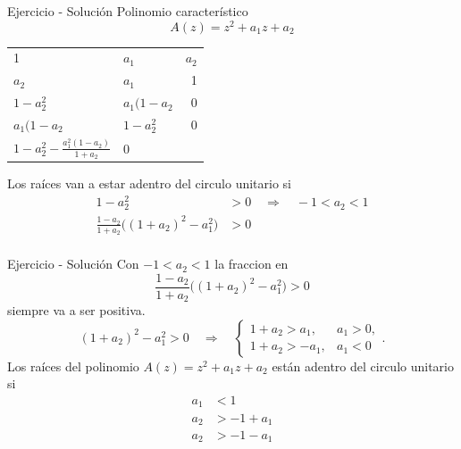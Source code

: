 \documentclass[presentation,aspectratio=169]{beamer}
\begin{document}
\begin{frame}[label={sec:orgf62d041}]{Ejercicio - Solución}
Polinomio característico \[A(z) = z^2 + a_1z + a_2\]

\begin{center}
\begin{tabular}{llr}
1 & \(a_1\) & \(a_2\)\\
\(a_2\) & \(a_1\) & 1\\
\(1 - a_2^2\) & \(a_1(1-a_2\) & 0\\
\(a_1(1-a_2\) & \(1 - a_2^2\) & 0\\
\(1-a_2^2 - \frac{a_1^2(1-a_2)}{1+a_2}\) & 0 & \\
\end{tabular}
\end{center}

Los raíces van a estar adentro del circulo unitario si
\begin{align*}
  1 - a_2^2 &> 0 \quad \Rightarrow \quad -1 < a_2 < 1\\
  \frac{1-a_2}{1+a_2} \big((1+a_2)^2 - a_1^2\big) &> 0\\
\end{align*}
\end{frame}

\begin{frame}[label={sec:org418c724}]{Ejercicio - Solución}
   Con \(-1 < a_2 < 1\) la fraccion en 
   \[\frac{1-a_2}{1+a_2} \big((1+a_2)^2 - a_1^2\big) > 0\]
   siempre va a ser positiva.
   \[(1+a_2)^2 - a_1^2 > 0 \quad \Rightarrow \quad \begin{cases} 1+a_2 > a_1, & a_1 > 0,\\ 1 + a_2 > -a_1, & a_1 < 0 \end{cases}. \]
Los raíces del polinomio \(A(z) = z^2 + a_1z + a_2\) están adentro del circulo unitario si
\begin{align*}
a_1 &< 1\\
a_2 &> -1+a_1\\
a_2 &> -1 - a_1
\end{align*}
\end{frame}
\end{document}

